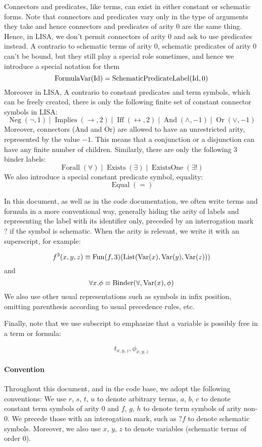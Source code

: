 \begin{defin}[Formulas]
  Connectors and predicates, like terms, can exist in either constant or schematic forms. Note that connectors and predicates vary only in the type of arguments they take and hence connectors and predicates of arity 0 are the same thing. Hence, in LISA, we don't permit connectors of arity 0 and ask to use predicates instead.
  A contrario to schematic terms of arity 0, schematic predicates of arity 0 can't be bound, but they still play a special role sometimes, and hence we introduce a special notation for them
  $$
    \operatorname{FormulaVar}(\textnormal{Id}) = \operatorname{SchematicPredicateLabel}(\textnormal{Id}, 0)
  $$
  Moreover in LISA, A contrario to constant predicates and term symbols, which can be freely created, there is only the following finite set of constant connector symbols in LISA:
  $$
    \operatorname{Neg}(\neg, 1)\mid \operatorname{Implies}(\rightarrow, 2)\mid \operatorname{Iff}(\leftrightarrow, 2)\mid \operatorname{And}(\land, -1)\mid \operatorname{Or}(\lor, -1)
  $$
  Moreover, connectors (And and Or) are allowed to have an unrestricted arity, represented by the value $-1$. This means that a conjunction or a disjunction can have any finite number of children.
  Similarly, there are only the following 3 binder labels:
  $$
    \operatorname{Forall}(\forall)\mid \operatorname{Exists}(\exists)\mid \operatorname{ExistsOne}(\exists !)
  $$
  We also introduce a special constant predicate symbol, equality:
  $$
    \operatorname{Equal}(=)
  $$
\end{defin}


In this document, as well as in the code documentation, we often write terms and formula in a more conventional way, generally hiding the arity of labels and representing the label with its identifier only, preceded by an interrogation mark ? if the symbol is schematic. When the arity is relevant, we write it with an superscript, for example:

$$
  f^3(x,y,z) \equiv \operatorname{Fun}(f, 3)(\operatorname{List}(\operatorname{Var}(x), \operatorname{Var}(y), \operatorname{Var}(z)))
$$
and
$$
  \forall x. \phi \equiv \operatorname{Binder}(\forall, \operatorname{Var}(x), \phi)
$$
We also use other usual representations such as symbols in infix position, omitting parenthesis according to usual precedence rules, etc.

Finally, note that we use subscript to emphasize that a variable is possibly free in a term or formula:

$$
  t_{x,y,z}, \phi_{x,y,z}
$$


\paragraph{Convention} Throughout this document, and in the code base, we adopt the following conventions: We use $r$, $s$, $t$, $u$ to denote arbitrary terms, $a$, $b$, $c$ to denote constant term symbols of arity $0$ and $f$, $g$, $h$ to denote term symbols of arity non-$0$. We precede those with an interogation mark, such as $?f$ to denote schematic symbols. Moreover, we also use $x$, $y$, $z$ to denote variables (schematic terms of order $0$).


